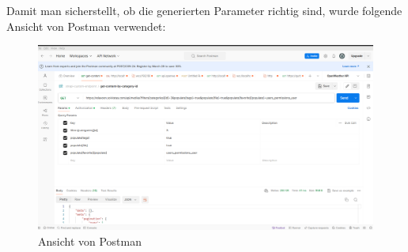 Damit man sicherstellt, ob die generierten Parameter richtig sind, wurde folgende Ansicht von Postman verwendet:
\begin{figure}[H]
  \centering
  \includegraphics[width=\textwidth]{./pics/postman.png}
  \caption{Ansicht von Postman}

\end{figure}


